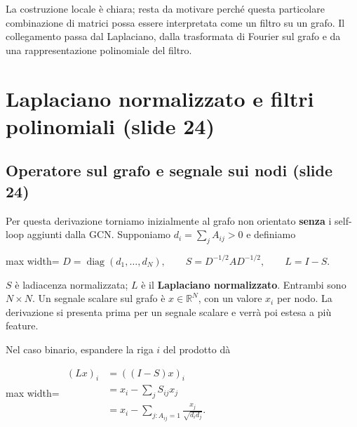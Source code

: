 \documentclass[11pt,a4paper,oneside,openany]{book}
\begin{document}
La costruzione locale è chiara; resta da motivare perché questa particolare combinazione di matrici possa essere interpretata come un filtro su un grafo. Il collegamento passa dal Laplaciano, dalla trasformata di Fourier sul grafo e da una rappresentazione polinomiale del filtro.

\section{Laplaciano normalizzato e filtri polinomiali (slide 24)}\label{f05-r298}

\subsection{Operatore sul grafo e segnale sui nodi (slide 24)}\label{f05-r300}

Per questa derivazione torniamo inizialmente al grafo non orientato \textbf{senza} i self-loop aggiunti dalla GCN. Supponiamo \(d_i=\sum_j A_{ij}>0\) e definiamo

\begin{center}
\begin{adjustbox}{max width=\linewidth}
$\displaystyle \boxed{D=\operatorname{diag}(d_1,\ldots,d_N),\qquad
S=D^{-1/2}AD^{-1/2},\qquad L=I-S.}$
\end{adjustbox}
\end{center}

\(S\) è l\textquotesingle adiacenza normalizzata; \(L\) è il \textbf{Laplaciano normalizzato}. Entrambi sono \(N\times N\). Un segnale scalare sul grafo è \(x\in\mathbb R^N\), con un valore \(x_i\) per nodo. La derivazione si presenta prima per un segnale scalare e verrà poi estesa a più feature.

Nel caso binario, espandere la riga \(i\) del prodotto dà

\begin{center}
\begin{adjustbox}{max width=\linewidth}
$\displaystyle \begin{aligned}
(Lx)_i&=((I-S)x)_i\\
&=x_i-\sum_j S_{ij}x_j\\
&=x_i-\sum_{j:A_{ij}=1}\frac{x_j}{\sqrt{d_i d_j}}.
\end{aligned}$
\end{adjustbox}
\end{center}
\end{document}
